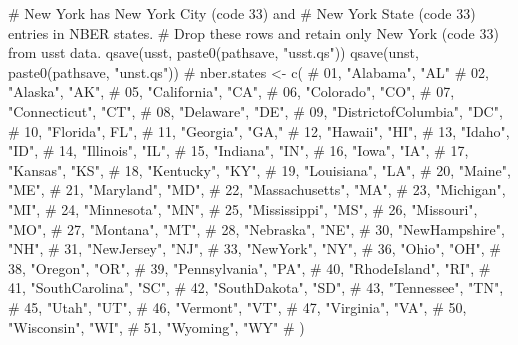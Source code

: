 \begin{appendix}
\begin{Schunk}
\begin{Sinput}
# New York has New York City (code 33) and 
# New York State (code 33) entries in NBER states.
# Drop these rows and retain only New York (code 33) from usst data. 
qsave(usst, paste0(pathsave, "usst.qs"))
qsave(unst, paste0(pathsave, "unst.qs"))
# nber.states <- c(
#   01, "Alabama", "AL"
#   02, "Alaska", "AK",
#   05, "California", "CA",
#   06, "Colorado", "CO",
#   07, "Connecticut", "CT",
#   08, "Delaware", "DE",
#   09, "DistrictofColumbia", "DC",
#   10, "Florida", FL",
#   11, "Georgia", "GA,"
#   12, "Hawaii", "HI",
#   13, "Idaho", "ID",
#   14, "Illinois", "IL",
#   15, "Indiana", "IN",
#   16, "Iowa", "IA",
#   17, "Kansas", "KS",
#   18, "Kentucky", "KY",
#   19, "Louisiana", "LA",
#   20, "Maine", "ME",
#   21, "Maryland", "MD",
#   22, "Massachusetts", "MA",
#   23, "Michigan", "MI",
#   24, "Minnesota", "MN",
#   25, "Mississippi", "MS",
#   26, "Missouri", "MO",
#   27, "Montana", "MT",
#   28, "Nebraska", "NE",
#   30, "NewHampshire", "NH",
#   31, "NewJersey", "NJ",
#   33, "NewYork", "NY",
#   36, "Ohio", "OH",
#   38, "Oregon", "OR",
#   39, "Pennsylvania", "PA",
#   40, "RhodeIsland", "RI",
#   41, "SouthCarolina", "SC",
#   42, "SouthDakota", "SD",
#   43, "Tennessee", "TN",
#   45, "Utah", "UT", 
#   46, "Vermont", "VT",
#   47, "Virginia", "VA", 
#   50, "Wisconsin", "WI",
#   51, "Wyoming", "WY"
# )
\end{Sinput}
\end{Schunk}


\end{appendix}
